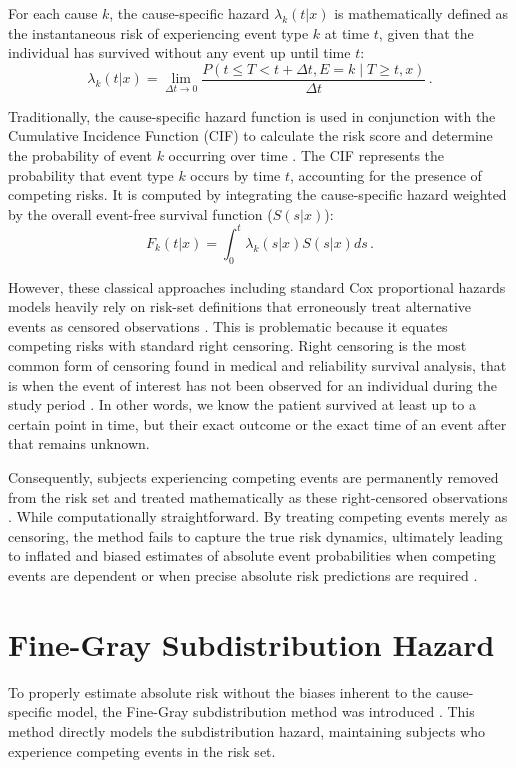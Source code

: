 \documentclass[a4paper,twoside,12pt]{report}
\begin{document}
For each cause $k$, the cause-specific hazard $\lambda_k(t|x)$ is mathematically defined as the instantaneous risk of experiencing event type $k$ at time $t$, given that the individual has survived without any event up until time $t$:
$$\lambda_k(t|x) = \lim_{\Delta t \to 0} \frac{P(t \le T < t+\Delta t, E = k \mid T \ge t, x)}{\Delta t} \,.$$

Traditionally, the cause-specific hazard function is used in conjunction with the Cumulative Incidence Function (CIF) to calculate the risk score and determine the probability of event $k$ occurring over time \citep{prentice1978analysis, pintilie2006competing}. The CIF represents the probability that event type $k$ occurs by time $t$, accounting for the presence of competing risks. It is computed by integrating the cause-specific hazard weighted by the overall event-free survival function ($S(s|x)$):
$$F_k(t|x) = \int_0^t \lambda_k(s|x) S(s|x) ds \,.$$

However, these classical approaches including standard Cox proportional hazards models heavily rely on risk-set definitions that erroneously treat alternative events as censored observations \citep{Cox1972}. This is problematic because it equates competing risks with standard right censoring. Right censoring is the most common form of censoring found in medical and reliability survival analysis, that is when the event of interest has not been observed for an individual during the study period \citep{kalbfleisch2002statistical}. In other words, we know the patient survived at least up to a certain point in time, but their exact outcome or the exact time of an event after that remains unknown. 

Consequently, subjects experiencing competing events are permanently removed from the risk set and treated mathematically as these right-censored observations \citep{latouche2013competing}. While computationally straightforward. By treating competing events merely as censoring, the method fails to capture the true risk dynamics, ultimately leading to inflated and biased estimates of absolute event probabilities when competing events are dependent or when precise absolute risk predictions are required \citep{pintilie2006competing, andersen2012competing}.


\section{Fine-Gray Subdistribution Hazard}

To properly estimate absolute risk without the biases inherent to the cause-specific model, the Fine-Gray subdistribution method was introduced \citep{FineGray1999}. This method directly models the subdistribution hazard, maintaining subjects who experience competing events in the risk set. 
\end{document}

